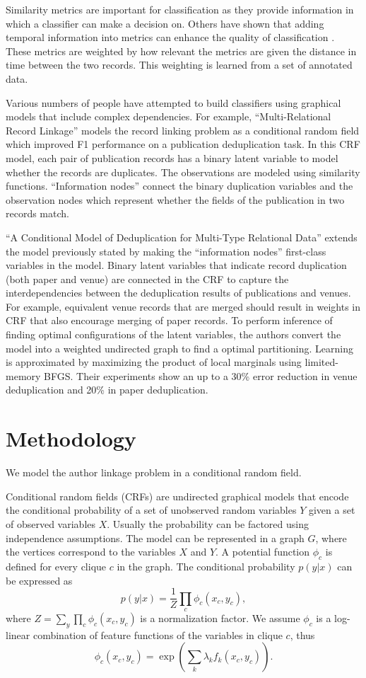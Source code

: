 \documentclass[twocolumn,letterpaper]{article}
\begin{document}
Similarity metrics are important for classification as they provide information in which a classifier can make a decision on. Others have shown that adding temporal information into metrics can enhance the quality of classification \cite{DBLP:journals/fcsc/LiDMS12}. These metrics are weighted by how relevant the metrics are given the distance in time between the two records. This weighting is learned from a set of annotated data.

Various numbers of people have attempted to build classifiers using graphical models that include complex dependencies. For example, ``Multi-Relational Record Linkage'' \cite{Domingos04multi} models the record linking problem as a conditional random field which improved F1 performance on a publication deduplication task. In this CRF model, each pair of publication records has a binary latent variable to model whether the records are duplicates.  The observations are modeled using similarity functions.  ``Information nodes'' connect the binary duplication variables and the observation nodes which represent whether the fields of the publication in two records match.

``A Conditional Model of Deduplication for Multi-Type Relational Data'' \cite{Culotta05aconditional} extends the model previously stated by making the ``information nodes'' first-class variables in the model.  Binary latent variables that indicate record duplication (both paper and venue) are connected in the CRF to capture the interdependencies between the deduplication results of publications and venues.  For example, equivalent venue records that are merged should result in weights in CRF that also encourage merging of paper records.  To perform inference of finding optimal configurations of the latent variables, the authors convert the model into a weighted undirected graph to find a optimal partitioning.  Learning is approximated by maximizing the product of local marginals using limited-memory BFGS.  Their experiments show an up to a 30\% error reduction in venue deduplication and 20\% in paper deduplication.

\section{Methodology} %
\label{sec:methodology}
We model the author linkage problem in a conditional random field.

Conditional random fields (CRFs) are undirected graphical models that encode the conditional probability of a set of unobserved random variables $Y$ given a set of observed variables $X$.  Usually the probability can be factored using independence assumptions.  The model can be represented in a graph $G$, where the vertices correspond to the variables $X$ and $Y$.  A potential function $\phi_c$ is defined for every clique $c$ in the graph.  The conditional probability $p(y|x)$ can be expressed as
$$p(y|x)=\frac{1}{Z}\prod_c \phi_c(x_c,y_c),$$
where $Z=\sum_y\prod_c \phi_c(x_c,y_c)$ is a normalization factor.  We assume $\phi_c$ is a log-linear combination of feature functions of the variables in clique $c$, thus
$$\phi_c(x_c,y_c)=\exp\left(\sum_k \lambda_k f_k(x_c,y_c)\right).$$
\end{document}
